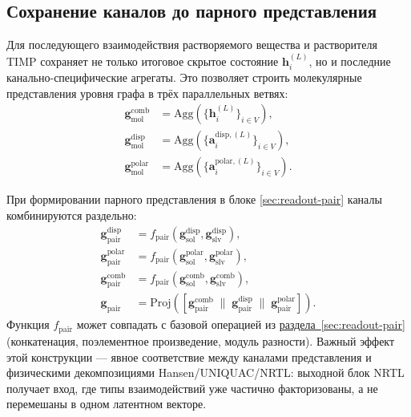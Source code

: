 \documentclass[11pt]{article}
\begin{document}
\subsection{Сохранение каналов до парного представления}

Для последующего взаимодействия растворяемого вещества и растворителя TIMP сохраняет не только итоговое скрытое состояние $\mathbf{h}_i^{(L)}$, но и последние канально-специфические агрегаты. Это позволяет строить молекулярные представления уровня графа в трёх параллельных ветвях:
\begin{align*}
\mathbf{g}_{\mathrm{mol}}^{\mathrm{comb}} &= \mathrm{Agg}\!\left(\{\mathbf{h}_i^{(L)}\}_{i\in V}\right), \\
\mathbf{g}_{\mathrm{mol}}^{\mathrm{disp}} &= \mathrm{Agg}\!\left(\{\mathbf{a}_i^{\mathrm{disp},(L)}\}_{i\in V}\right), \\
\mathbf{g}_{\mathrm{mol}}^{\mathrm{polar}} &= \mathrm{Agg}\!\left(\{\mathbf{a}_i^{\mathrm{polar},(L)}\}_{i\in V}\right).
\end{align*}

При формировании парного представления в блоке \hyperref[sec:readout-pair]{\ref*{sec:readout-pair}} каналы комбинируются раздельно:
\begin{align*}
\mathbf{g}_{\mathrm{pair}}^{\mathrm{disp}} &= f_{\mathrm{pair}}\!\left(\mathbf{g}_{\mathrm{sol}}^{\mathrm{disp}},\mathbf{g}_{\mathrm{slv}}^{\mathrm{disp}}\right), \\
\mathbf{g}_{\mathrm{pair}}^{\mathrm{polar}} &= f_{\mathrm{pair}}\!\left(\mathbf{g}_{\mathrm{sol}}^{\mathrm{polar}},\mathbf{g}_{\mathrm{slv}}^{\mathrm{polar}}\right), \\
\mathbf{g}_{\mathrm{pair}}^{\mathrm{comb}} &= f_{\mathrm{pair}}\!\left(\mathbf{g}_{\mathrm{sol}}^{\mathrm{comb}},\mathbf{g}_{\mathrm{slv}}^{\mathrm{comb}}\right), \\
\mathbf{g}_{\mathrm{pair}} &= \mathrm{Proj}\!\left([\mathbf{g}_{\mathrm{pair}}^{\mathrm{comb}} \;\|\; \mathbf{g}_{\mathrm{pair}}^{\mathrm{disp}} \;\|\; \mathbf{g}_{\mathrm{pair}}^{\mathrm{polar}}]\right).
\end{align*}
Функция $f_{\mathrm{pair}}$ может совпадать с базовой операцией из \hyperref[sec:readout-pair]{раздела~\ref*{sec:readout-pair}} (конкатенация, поэлементное произведение, модуль разности). Важный эффект этой конструкции --- явное соответствие между каналами представления и физическими декомпозициями Hansen/UNIQUAC/NRTL: выходной блок NRTL получает вход, где типы взаимодействий уже частично факторизованы, а не перемешаны в одном латентном векторе.
\end{document}

